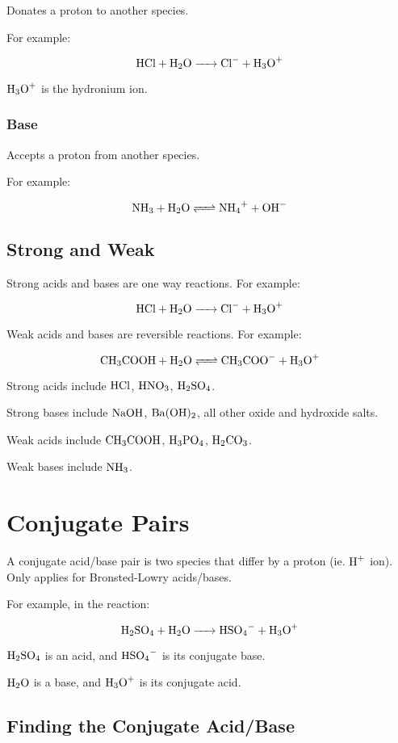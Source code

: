 \documentclass[a4paper,11pt]{article}
\begin{document}
Donates a proton to another species.

For example:

$$
\ce{HCl + H2O -> Cl- + H3O+}
$$

$\ce{H3O+}$ is the hydronium ion.


\subsubsection{Base}

Accepts a proton from another species.

For example:

$$
\ce{NH3 + H2O <=> NH4+ + OH-}
$$


\subsection{Strong and Weak}

Strong acids and bases are one way reactions. For example:

$$
\ce{HCl + H2O -> Cl- + H3O+}
$$

Weak acids and bases are reversible reactions. For example:

$$
\ce{CH3COOH + H2O <=> CH3COO- + H3O+}
$$

Strong acids include $\ce{HCl}$, $\ce{HNO3}$, $\ce{H2SO4}$.

Strong bases include $\ce{NaOH}$, $\ce{Ba(OH)2}$, all other oxide and hydroxide
salts.

Weak acids include $\ce{CH3COOH}$, $\ce{H3PO4}$, $\ce{H2CO3}$.

Weak bases include $\ce{NH3}$.


\section{Conjugate Pairs}

A conjugate acid/base pair is two species that differ by a proton (ie.
$\ce{H+}$ ion). Only applies for Bronsted-Lowry acids/bases.

For example, in the reaction:

$$
\ce{H2SO4 + H2O -> HSO4- + H3O+}
$$

$\ce{H2SO4}$ is an acid, and $\ce{HSO4-}$ is its conjugate base.

$\ce{H2O}$ is a base, and $\ce{H3O+}$ is its conjugate acid.


\subsection{Finding the Conjugate Acid/Base}
\end{document}
